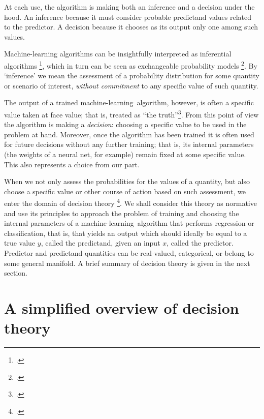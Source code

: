 \documentclass[\ifafour a4paper,12pt,\else a5paper,10pt,\fi%
onecolumn,oneside,article,%
british%
]{memoir}
\theoremstyle{remark}
\theoremstyle{innote}
\newcommand*{\citep}{\footcites}
\renewcommand*{\|}[1][]{\nonscript\:#1\vert\nonscript\:\mathopen{}}
\newcommand*{\sect}{\S}%
\newcommand*{\chap}{ch.}%
\newcommand*{\chaps}{chs}%
\newcommand*{\cf}{{cf.}}
\newcommand*{\ml}{machine-learning}
\begin{document}
At each use, the algorithm is making both an inference and a decision under
the hood. An inference because it must consider probable predictand values
related to the predictor. A decision because it chooses as its output only
one among such values.






Machine-learning algorithms can be insightfully interpreted as inferential
algorithms
\citep{tishbyetal1989,levinetal1990,mackay1992,mackay1992b,mackay1992c,mackay1992d}[esp.
Part~V]{mackay1995_r2005}{neal1996}, which in turn can be seen as
exchangeable probability models \citep[\chap~4]{bernardoetal1994_r2000}. By
\enquote*{inference} we mean the assessment of a probability distribution
for some quantity or scenario of interest, \emph{without commitment} to any
specific value of such quantity.

The output of a trained \ml\ algorithm, however, is often a specific value
taken at face value; that is, treated as \enquote{the
  truth}\citep[\cf][\sect~3]{mackay1992b}. From this point of view the
algorithm is making a \emph{decision}: choosing a specific value to be used
in the problem at hand. Moreover, once the algorithm has been trained it is
often used for future decisions without any further training; that is, its
internal parameters (the weights of a neural net, for example) remain fixed
at some specific value. This also represents a choice from our part.

When we not only assess the probabilities for the values of a quantity, but
also choose a specific value or other course of action based on such
assessment, we enter the domain of decision theory
\citep{savage1954_r1972,raiffaetal1961_r2000,berger1980_r1985}[\chap~2]{bernardoetal1994_r2000}{prattetal1995_r1996}[\chaps~13--14]{jaynes1994_r2003}[for
a charming introduction see][]{raiffa1968_r1970}. We shall consider this
theory as normative and use its principles to approach the problem of
training and choosing the internal parameters of a \ml\ algorithm that
performs regression or classification, that is, that yields an output which
should ideally be equal to a true value $y$, called the predictand, given
an input $x$, called the predictor. Predictor and predictand quantities can
be real-valued, categorical, or belong to some general manifold. A brief
summary of decision theory is given in the next section.

\section{A simplified overview of decision theory}
\label{sec:dec_theory_overview}
\end{document}
